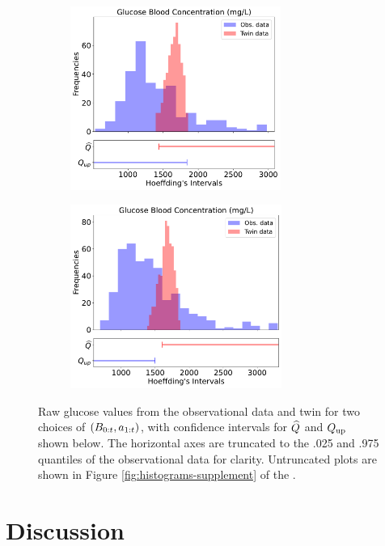 \begin{figure}%
    \centering
    \begin{subfigure}[b]{0.5\textwidth}
    \centering
    \includegraphics[height=6cm]{figures/causal/latest_experimental_results/truncated_hists/Glucose_hyp_1_with_hoeff_onesided_loFalse_p0.2_nogray.pdf}
    \label{fig:glucosea}
    \end{subfigure}%
    \begin{subfigure}[b]{0.5\textwidth}
    \centering
    \includegraphics[height=6cm]{figures/causal/latest_experimental_results/truncated_hists/Glucose_hyp_5_with_hoeff_onesided_loFalse_p0.2_nogray.pdf}
    \label{fig:glucoseb}
    \end{subfigure}
    \caption{Raw glucose values from the observational data and twin for two choices of $(B_{0:t}, a_{1:t})$, with confidence intervals for $\widehat{Q}$ and $Q_{\mathrm{up}}$ shown below. The horizontal axes are truncated to the .025 and .975 quantiles of the observational data for clarity. Untruncated plots are shown in Figure \ref{fig:histograms-supplement} of the \AppendixName.}
    \label{fig:histograms}
\end{figure}


\section{Discussion}


